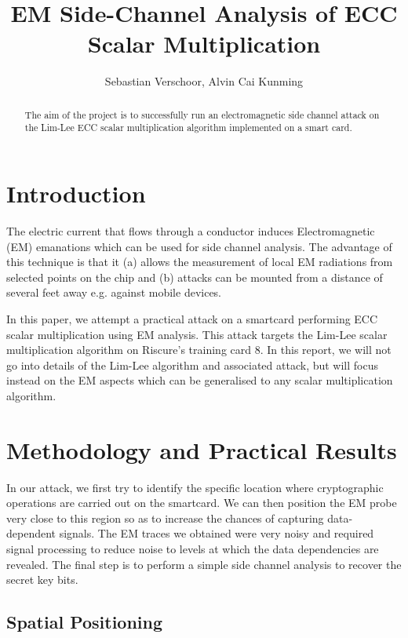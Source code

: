 \documentclass{llncs}
\begin{document}
\title{EM Side-Channel Analysis of ECC Scalar Multiplication}
\author{Sebastian Verschoor, Alvin Cai Kunming}
\maketitle
%
\begin{abstract}
The aim of the project is to successfully run an electromagnetic side channel attack on the Lim-Lee ECC scalar multiplication algorithm implemented on a smart card. 
\end{abstract} 
%
\section{Introduction}

The electric current that flows through a conductor induces Electromagnetic (EM) emanations which can be used for side channel analysis. The advantage of this technique is that it (a) allows the measurement of local EM radiations from selected points on the chip \cite{gandolfi2001} and (b) attacks can be mounted from a distance of several feet away \cite{kenworthy2012} e.g. against mobile devices.

In this paper, we attempt a practical attack on a smartcard performing ECC scalar multiplication using EM analysis. This attack targets the Lim-Lee scalar multiplication algorithm on Riscure's training card 8. In this report, we will not go into details of the Lim-Lee algorithm and associated attack, but will focus instead on the EM aspects which can be generalised to any scalar multiplication algorithm.

\section{Methodology and Practical Results}

In our attack, we first try to identify the specific location where cryptographic operations are carried out on the smartcard. We can then position the EM probe very close to this region so as to increase the chances of capturing data-dependent signals. The EM traces we obtained were very noisy and required signal processing to reduce noise to levels at which the data dependencies are revealed. The final step is to perform a simple side channel analysis to recover the secret key bits.

\subsection{Spatial Positioning}
\end{document}
